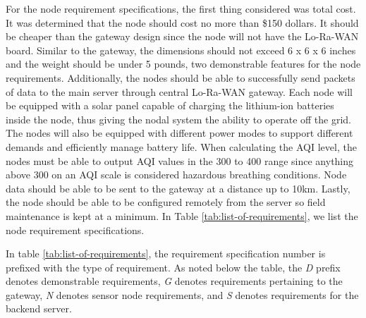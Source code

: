 For the node requirement specifications, the first thing considered was total cost. It was determined that the node should cost no more than \$150 dollars. It should be cheaper than the gateway design since the node will not have the Lo-Ra-WAN board. Similar to the gateway, the dimensions should not exceed 6 x 6 x 6 inches and the weight should be under 5 pounds, two demonstrable features for the node requirements. Additionally, the nodes should be able to successfully send packets of data to the main server through central Lo-Ra-WAN gateway. Each node will be equipped with a solar panel capable of charging the lithium-ion batteries inside the node, thus giving the nodal system the ability to operate off the grid. The nodes will also be equipped with different power modes to support different demands and efficiently manage battery life. When calculating the AQI level, the nodes must be able to output AQI values in the 300 to 400 range since anything above 300 on an AQI scale is considered hazardous breathing conditions. Node data should be able to be sent to the gateway at a distance up to 10km. Lastly, the node should be able to be configured remotely from the server so field maintenance is kept at a minimum. In Table \ref{tab:list-of-requirements}, we list the node requirement specifications.  

In table \ref{tab:list-of-requirements}, the requirement specification number is prefixed with the
type of requirement. As noted below the table, the \emph{D} prefix denotes demonstrable
requirements, \emph{G} denotes requirements pertaining to the gateway, \emph{N} denotes sensor node
requirements, and \emph{S} denotes requirements for the backend server.

